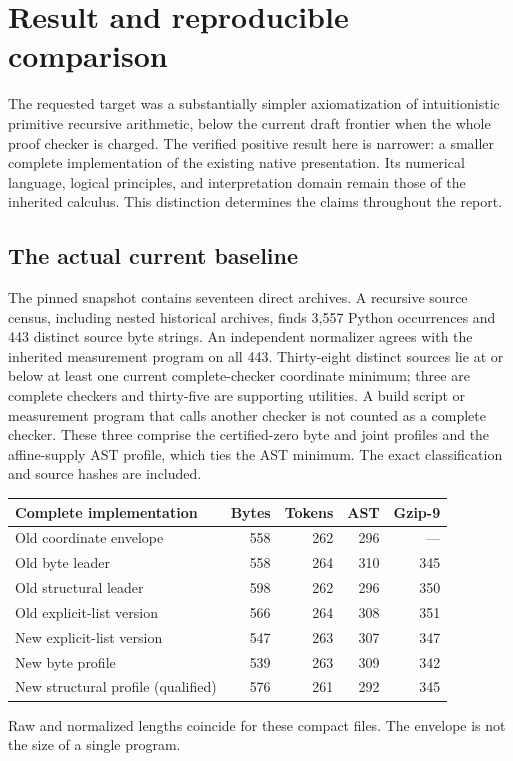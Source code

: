 \documentclass[11pt,letterpaper]{article}
\theoremstyle{definition}\newtheorem{definition}[theorem]{Definition}
\theoremstyle{remark}\newtheorem{remark}[theorem]{Remark}
\begin{document}
\section{Result and reproducible comparison}
\label{sec:result}

The requested target was a substantially simpler axiomatization of
intuitionistic primitive recursive arithmetic, below the current draft
frontier when the whole proof checker is charged. The verified positive
result here is narrower: a smaller complete implementation of the
existing native presentation. Its numerical language, logical principles,
and interpretation domain remain those of the inherited calculus.
This distinction determines the claims throughout the report.

\subsection{The actual current baseline}

The pinned snapshot contains seventeen direct archives. A recursive
source census, including nested historical archives, finds 3,557 Python
occurrences and 443 distinct source byte strings. An independent
normalizer agrees with the inherited measurement program on all 443.
Thirty-eight distinct sources lie at or below at least one current
complete-checker coordinate minimum; three are complete checkers and
thirty-five are supporting utilities. A build script or measurement
program that calls another checker is not counted as a complete checker.
These three comprise the certified-zero byte and joint profiles and
the affine-supply AST profile, which ties the AST minimum. The exact
classification and source hashes are included.

\begin{center}
\small
\begin{tabular}{lrrrr}
\toprule
Complete implementation & Bytes & Tokens & AST & Gzip-9\\
\midrule
Old coordinate envelope & 558 & 262 & 296 & ---\\
\midrule
Old byte leader & 558 & 264 & 310 & 345\\
Old structural leader & 598 & 262 & 296 & 350\\
Old explicit-list version & 566 & 264 & 308 & 351\\
\midrule
New explicit-list version & 547 & 263 & 307 & 347\\
New byte profile & 539 & 263 & 309 & 342\\
New structural profile (qualified) & 576 & 261 & 292 & 345\\
\bottomrule
\end{tabular}
\end{center}
Raw and normalized lengths coincide for these compact files. The envelope
is not the size of a single program.
\end{document}
